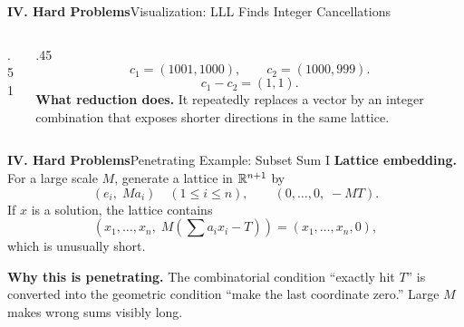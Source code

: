 \begin{frame}{\textbf{IV. Hard Problems}}{Visualization: LLL Finds Integer Cancellations}
\small
\begin{columns}[T,onlytextwidth]
\begin{column}{.51\textwidth}
\begin{center}
\end{center}
\end{column}
\begin{column}{.45\textwidth}
\[
  c_1=(1001,1000),\qquad c_2=(1000,999).
\]
\[
  c_1-c_2=(1,1).
\]
\textbf{What reduction does.}\; It repeatedly replaces a vector by an integer combination that exposes shorter directions in the same lattice.
\end{column}
\end{columns}
\end{frame}

\begin{frame}{\textbf{IV. Hard Problems}}{Penetrating Example: Subset Sum I}
\small
{}
\textbf{Lattice embedding.}\; For a large scale $M$, generate a lattice in $\mathbb{R}^{n+1}$ by
\[
  (e_i,\;Ma_i)\quad(1\le i\le n),\qquad (0,\ldots,0,\;-MT).
\]
If $x$ is a solution, the lattice contains
\[
  (x_1,\ldots,x_n,\;M(\sum a_i x_i-T))=(x_1,\ldots,x_n,0),
\]
which is unusually short.

\textbf{Why this is penetrating.}\; The combinatorial condition ``exactly hit $T$'' is converted into the geometric condition ``make the last coordinate zero.''  Large $M$ makes wrong sums visibly long.
\end{frame}

